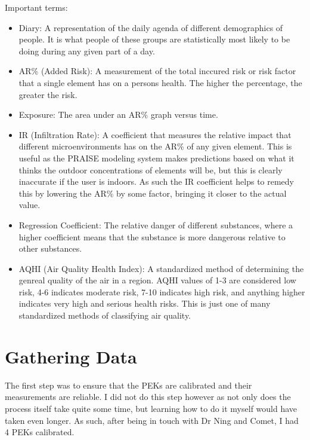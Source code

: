 \documentclass{article}
\begin{document}
\begin{multicols}{2}
Important terms:
\begin{itemize}
  \item Diary: A representation of the daily agenda of different demographics of 
  people. It is what people of these groups are statistically most likely to be doing 
  during any given part of a day.
  \item AR\% (Added Risk): A measurement of the total inccured risk or risk factor that a single 
  element has on a persons health. The higher the percentage, the greater the risk.
  \item Exposure: The area under an AR\% graph versus time.
  \item IR (Infiltration Rate): A coefficient that measures the relative impact that 
  different microenvironments has on the AR\% of any given element. This is useful as 
  the PRAISE modeling system makes predictions based on what it thinks the outdoor 
  concentrations of elements will be, but this is clearly inaccurate if the user is 
  indoors. As such the IR coefficient helps to remedy this by lowering the AR\% by 
  some factor, bringing it closer to the actual value.
  \item Regression Coefficient: The relative danger of different substances, where 
  a higher coefficient means that the substance is more dangerous relative to other 
  substances.
  \item AQHI (Air Quality Health Index): A standardized method of determining the 
  genreal quality of the air in a region. AQHI values of 1-3 are considered low risk, 
  4-6 indicates moderate risk, 7-10 indicates high risk, and anything higher indicates 
  very high and serious health risks. This is just one of many standardized methods of 
  classifying air quality.
\end{itemize}


\section{Gathering Data}
\label{section:Procedure}

The first step was to ensure that the PEKs are calibrated and their 
measurements are reliable. I did not do this step however as not only 
does the process itself take quite some time, but learning how to do 
it myself would have taken even longer. As such, after being in touch with 
Dr Ning and Comet, I had 4 PEKs calibrated.


\end{multicols}
\end{document}
